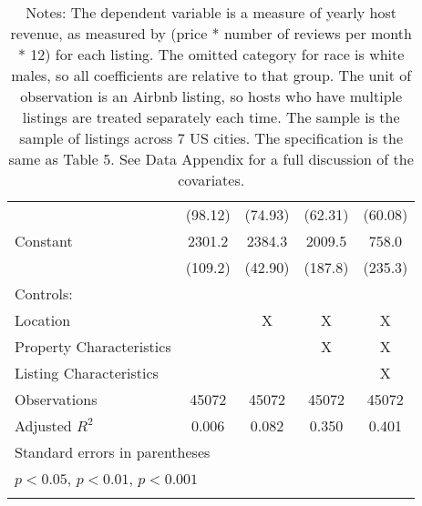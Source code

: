 {\begin{longtable}{l*{4}{c}}
                    &     (98.12)         &     (74.93)         &     (62.31)         &     (60.08)         \\
[1em]
Constant            &      2301.2\sym{***}&      2384.3\sym{***}&      2009.5\sym{***}&       758.0\sym{**} \\
                    &     (109.2)         &     (42.90)         &     (187.8)         &     (235.3)         \\
\hline
Controls:        \\
\hspace{3mm} Location  &                &       X         &       X         &       X         \\
\hspace{3mm} Property Characteristics  &                &                &       X         &       X         \\
\hspace{3mm} Listing Characteristics  &                &                &                &       X         \\
\hline
Observations        &       45072         &       45072         &       45072         &       45072         \\
Adjusted \(R^{2}\)  &       0.006         &       0.082         &       0.350         &       0.401         \\
\hline\hline
\multicolumn{5}{l}{\footnotesize Standard errors in parentheses}\\
\multicolumn{5}{l}{\footnotesize \sym{*} \(p<0.05\), \sym{**} \(p<0.01\), \sym{***} \(p<0.001\)}\\
\caption*{Notes: The dependent variable is a measure of yearly host revenue, as measured by (price * number of reviews per month * 12) for each listing. The omitted category for race is white males, so all coefficients are relative to that group. The unit of observation is an Airbnb listing, so hosts who have multiple listings are treated separately each time. The sample is the sample of listings across 7 US cities. The specification is the same as Table 5. See Data Appendix for a full discussion of the covariates. }
\end{longtable}
}

\begin{comment}
[1em]
Middle-aged         &       18.31         &       98.64\sym{*}  &      -33.37         &      -121.1\sym{***}\\
&     (55.99)         &     (44.60)         &     (36.71)         &     (36.42)         \\
[1em]
Old ($>$ 65)                 &       222.9         &       249.5         &      -73.13         &      -266.0\sym{*}  \\
&     (158.6)         &     (135.3)         &     (113.0)         &     (112.5)         \\
\end{comment}
